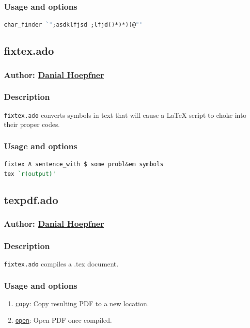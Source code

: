 \documentclass[11pt]{article}
\begin{document}
{\subsubsection{Usage and options}
\begin{lstlisting}[language=Stata, numbers=none]
char_finder `";asdklfjsd ;lfjd()*)*)(@"'
\end{lstlisting}


\subsection{fixtex.ado}
\subsubsection{Author: \href{mailto:dhoepfner@gibsonconsult.com}{Danial Hoepfner}}
\subsubsection{Description}
\texttt{fixtex.ado} converts symbols in text that will cause a \LaTeX{} script to choke into their proper codes.
\subsubsection{Usage and options}
\begin{lstlisting}[language=Stata, numbers=none]
fixtex A sentence_with $ some probl&em symbols
tex `r(output)'
\end{lstlisting}


\subsection{texpdf.ado}
\subsubsection{Author: \href{mailto:dhoepfner@gibsonconsult.com}{Danial Hoepfner}}
\subsubsection{Description}
\texttt{fixtex.ado} compiles a .tex document.
\subsubsection{Usage and options}
\begin{enumerate}
\item \texttt{\underline{c}opy}: Copy resulting PDF to a new location.
\item \texttt{\underline{open}}: Open PDF once compiled.
\end{enumerate}

}
\end{document}
